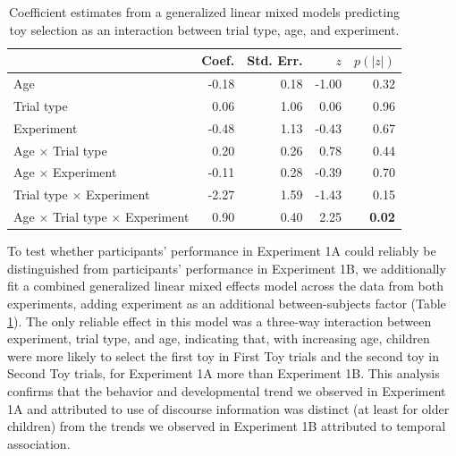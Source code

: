 \documentclass[man]{apa2}
\begin{document}
  \begin{table} [t]
   \caption{Coefficient estimates from a generalized linear mixed models predicting toy selection as an interaction between trial type, age, and experiment.
   \label{tab:coefficient_estimates_full} } 
   \begin{center} 
     \begin{tabular}{lrrrr} 
       \hline 
       \null  & Coef. & Std. Err. & $z$  &  $p(|z|)$ \\
       \hline  
        Age                                                                     & -0.18 &  0.18 & -1.00 & 0.32 \\
        Trial type                                                            & 0.06 &1.06 &  0.06 & 0.96 \\
        Experiment                                                         & -0.48 & 1.13 &  -0.43 & 0.67 \\
        Age $\times$ Trial type                                      & 0.20 & 0.26 & 0.78 & 0.44\\ 
        Age $\times$ Experiment                                   & -0.11 & 0.28 & -0.39 & 0.70\\ 
        Trial type $\times$ Experiment                          & -2.27 & 1.59 & -1.43 & 0.15 \\ 
        Age $\times$ Trial type $\times$ Experiment    & 0.90 & 0.40 & 2.25 & {\bf 0.02} \\ 
       \hline 
     \end{tabular} 
  \end{center}
 \end{table}
 
To test whether participants' performance in Experiment 1A could reliably be distinguished from participants' performance in Experiment 1B, we additionally fit a combined generalized linear mixed effects model across the data from both experiments, adding experiment as an additional between-subjects factor (Table \ref{tab:coefficient_estimates_full}).  The only reliable effect in this model was a three-way interaction between experiment, trial type, and age, indicating that, with increasing age, children were more likely to select the first toy in First Toy trials and the second toy in Second Toy trials, for Experiment 1A more than Experiment 1B. This analysis confirms that the behavior and developmental trend we observed in Experiment 1A and attributed to use of discourse information was distinct (at least for older children) from the trends we observed in Experiment 1B attributed to temporal association.
\end{document}
